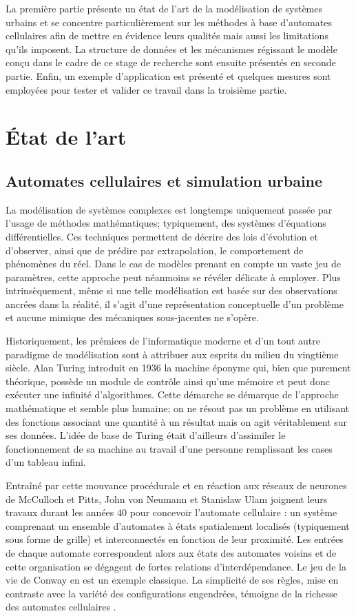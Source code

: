 \documentclass[10pt]{article}
\begin{document}
La première partie présente un état de l'art de la modélisation de
systèmes urbains et se concentre particulièrement sur les méthodes à
base d'automates cellulaires afin de mettre en évidence leurs qualités
mais aussi les limitations qu'ils imposent. La structure de données et
les mécanismes régissant le modèle conçu dans le cadre de ce stage de
recherche sont ensuite présentés en seconde partie. Enfin, un exemple
d'application est présenté et quelques mesures sont employées pour
tester et valider ce travail dans la troisième partie.

\section{\'Etat de l'art}

\subsection{Automates cellulaires et simulation urbaine}

La modélisation de systèmes complexes est longtemps uniquement passée
par l'usage de méthodes mathématiques; typiquement, des systèmes
d'équations différentielles. Ces techniques permettent de décrire des
lois d'évolution et d'observer, ainsi que de prédire par
extrapolation, le comportement de phénomènes du réel. Dans le cas de
modèles prenant en compte un vaste jeu de paramètres, cette approche
peut néanmoins se révéler délicate à employer. Plus intrinsèquement,
même si une telle modélisation est basée sur des observations ancrées
dans la réalité, il s'agit d'une représentation conceptuelle d'un
problème et aucune mimique des mécaniques sous-jacentes ne s'opère.

Historiquement, les prémices de l'informatique moderne et d'un tout
autre paradigme de modélisation sont à attribuer aux esprits du milieu
du vingtième siècle. Alan Turing introduit en 1936 la machine éponyme
qui, bien que purement théorique, possède un module de contrôle ainsi
qu'une mémoire et peut donc exécuter une infinité d'algorithmes. Cette
démarche se démarque de l'approche mathématique et semble plus
humaine; on ne résout pas un problème en utilisant des fonctions
associant une quantité à un résultat mais on agit véritablement sur
ses données. L'idée de base de Turing était d'ailleurs d'assimiler le
fonctionnement de sa machine au travail d'une personne remplissant les
cases d'un tableau infini.

Entraîné par cette mouvance procédurale et en réaction aux réseaux de
neurones de McCulloch et Pitts, John von Neumann et Stanislaw Ulam
joignent leurs travaux durant les années 40 pour concevoir l'automate
cellulaire : un système comprenant un ensemble d'automates à états
spatialement localisés (typiquement sous forme de grille) et
interconnectés en fonction de leur proximité. Les entrées de chaque
automate correspondent alors aux états des automates voisins et de
cette organisation se dégagent de fortes relations
d'interdépendance. Le jeu de la vie de Conway en est un exemple
classique. La simplicité de ses règles, mise en contraste avec la
variété des configurations engendrées, témoigne de la richesse des
automates cellulaires \cite{Gardner1970}.
\end{document}
